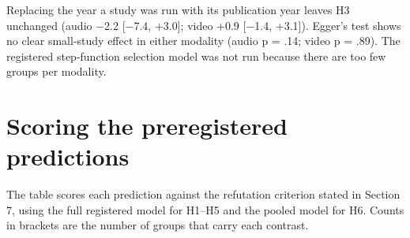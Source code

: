 \documentclass[11pt]{article}
\begin{document}
Replacing the year a study was run with its publication year leaves H3
unchanged (audio −2.2 {[}−7.4, +3.0{]}; video +0.9 {[}−1.4, +3.1{]}).
Egger's test shows no clear small-study effect in either modality (audio
p = .14; video p = .89). The registered step-function selection model
was not run because there are too few groups per modality.

\hypertarget{scoring-the-preregistered-predictions}{%
\section{Scoring the preregistered
predictions}\label{scoring-the-preregistered-predictions}}

The table scores each prediction against the refutation criterion stated
in Section 7, using the full registered model for H1--H5 and the pooled
model for H6. Counts in brackets are the number of groups that carry
each contrast.
\end{document}
